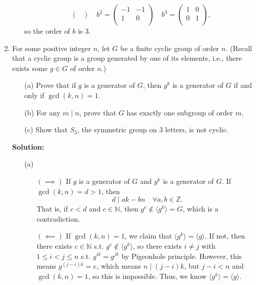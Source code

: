 \documentclass[12pt]{article}
\begin{document}
\begin{enumerate}
\begin{itemize}
\[\begin{pmatrix}
            \end{pmatrix} \quad b^2 = \begin{pmatrix}
                -1 & -1  \\
                1 & 0  \\
            \end{pmatrix} \quad b^3 = 
            \begin{pmatrix}
                 1& 0  \\
                 0& 1  \\
            \end{pmatrix},
        \]
         so the order of \(b\) is \(3\).  
    \end{itemize}           

    \item For some positive integer $n$, let $G$ be a finite cyclic group of order $n$. (Recall that a
    cyclic group is a group generated by one of its elements, i.e., there exists some $g \in G$
    of order $n$.)
    \begin{enumerate}
        \item[(a)] Prove that if $g$ is a generator of $G$, then $g^k$ is a generator of $G$ if and only if
        $\gcd(k, n) = 1$.
        \item[(b)] For any $m \mid n$, prove that $G$ has exactly one subgroup of order $m$.
        \item[(c)] Show that $S_3$, the symmetric group on 3 letters, is not cyclic.
    \end{enumerate}
    \textbf{Solution:} \vphantom{text}
    \begin{itemize}
        \item [(a)] \vphantom{text}
        \begin{itemize}
            \item [\((\implies)\)] If \(g\) is a generator of \(G\) and \(g^k\) is a generator of \(G\). If \(\gcd(k, n) = d > 1\), then 
            \[
                d \mid ak - bn \quad \forall a, b \in \mathbb{Z} .
            \] That is, if \(c < d\) and \(c \in \mathbb{N} \), then \(g^c \notin \langle g^k \rangle = G \), which is a contradiction.  
            \item [\((\impliedby)\)] If \(\gcd(k, n) = 1\), we claim that \(\langle g^k \rangle = \langle g \rangle \). If not, then there exists \(c \in \mathbb{N} \) s.t. \(g^c \notin \langle g^k \rangle \), so there exists \(i \neq j\) with \(1 \le i < j \le n\) s.t. \(g^{ik} = g^{jk}\) by Pigeonhole principle. However, this means \(g^{(j - i)k} = e\), which means \(n \mid (j - i)k\), but \(j - i < n\) and \(\gcd(k, n) = 1\), so this is impossible. Thus, we know \(\langle g^k \rangle = \langle g \rangle \).            

\end{itemize}
\end{itemize}
\end{enumerate}
\end{document}
